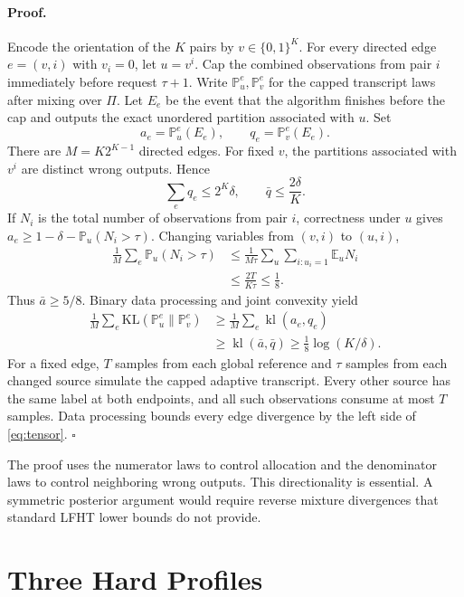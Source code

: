 \documentclass[twoside]{article}
\newcommand{\E}{\mathbb E}
\newcommand{\Pp}{\mathbb P}
\newcommand{\KL}{\mathrm{KL}}
\begin{document}
\paragraph{Proof.} Encode the orientation of the $K$ pairs by $v\in\{0,1\}^K$. For every directed edge $e=(v,i)$ with $v_i=0$, let $u=v^i$. Cap the combined observations from pair $i$ immediately before request $\tau+1$. Write $\Pp_u^e,\Pp_v^e$ for the capped transcript laws after mixing over $\Pi$. Let $E_e$ be the event that the algorithm finishes before the cap and outputs the exact unordered partition associated with $u$. Set
\[ a_e=\Pp_u^e(E_e),\qquad q_e=\Pp_v^e(E_e). \] There are $M=K2^{K-1}$ directed edges. For fixed $v$, the partitions associated with $v^i$ are distinct wrong outputs. Hence
\begin{equation}
\sum_e q_e\leq2^K\delta,\qquad \bar q\leq\frac{2\delta}{K}.
\label{eq:qbar}
\end{equation}
If $N_i$ is the total number of observations from pair $i$, correctness under $u$ gives $a_e\geq1-\delta-\Pp_u(N_i>\tau)$. Changing variables from $(v,i)$ to $(u,i)$,
\begin{align}
\frac1M\sum_e\Pp_u(N_i>\tau)
&\leq\frac{1}{M\tau}\sum_u\sum_{i:u_i=1}\E_uN_i\\
&\leq\frac{2T}{K\tau}\leq\frac18.
\label{eq:capaverage}
\end{align}
Thus $\bar a\geq5/8$. Binary data processing and joint convexity yield
\begin{align}
\frac1M\sum_e\KL(\Pp_u^e\|\Pp_v^e)
&\geq\frac1M\sum_e\operatorname{kl}(a_e,q_e)\\
&\geq\operatorname{kl}(\bar a,\bar q)
\geq\frac18\log(K/\delta).
\label{eq:binarykl}
\end{align}
For a fixed edge, $T$ samples from each global reference and $\tau$ samples from each changed source simulate the capped adaptive transcript. Every other source has the same label at both endpoints, and all such observations consume at most $T$ samples. Data processing bounds every edge divergence by the left side of \eqref{eq:tensor}. \hfill$\square$

The proof uses the numerator laws to control allocation and the denominator laws to control neighboring wrong outputs. This directionality is essential. A symmetric posterior argument would require reverse mixture divergences that standard LFHT lower bounds do not provide.

\section{Three Hard Profiles}
\end{document}
